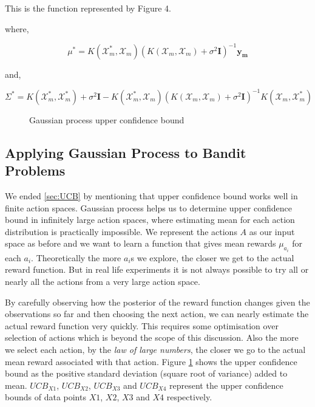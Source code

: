 \documentclass[english]{tktltiki}
\begin{document}
This is the function represented by Figure 4.

where,

\begin{equation}
\mu^* = K(\mathcal{X}_m^*, \mathcal{X}_m)(K(\mathcal{X}_m, \mathcal{X}_m) + \sigma^2 \mathbf{I})^{-1}\mathbf{y_m}
\label{gauss_poster_mean}
\end{equation}

and,

\begin{equation}
\Sigma^* = K(\mathcal{X}_m^*, \mathcal{X}_m^*) + \sigma^2 \mathbf{I} - K(\mathcal{X}_m^*, \mathcal{X}_m)(K(\mathcal{X}_m, \mathcal{X}_m) + \sigma^2 \mathbf{I})^{-1} K(\mathcal{X}_m, \mathcal{X}_m^*)
\label{gauss_poster_var}
\end{equation}

\begin{figure}[htb] 
\centering
 
\caption{Gaussian process upper confidence bound}
\label{fig:gp_ucb}
\end{figure}

\subsection{Applying Gaussian Process to Bandit Problems}

We ended \ref{sec:UCB} by mentioning that upper confidence bound works well in finite action spaces. Gaussian process helps us to determine upper confidence bound in infinitely large action spaces, where estimating mean for each action distribution is practically impossible. We represent the actions $A$ as our input space as before and we want to learn a function that gives mean rewards $\mu_{a_i}$ for each $a_i$. Theoretically the more $a_i$s we explore, the closer we get to the actual reward function. But in real life experiments it is not always possible to try all or nearly all the actions from a very large action space.





By carefully observing how the posterior of the reward function changes given the observations so far and then choosing the next action, we can nearly estimate the actual reward function very quickly. This requires some optimisation over selection of actions which is beyond the scope of this discussion. Also the more we select each action, by the \textit{law of large numbers}, the closer we go to the actual mean reward associated with that action. Figure \ref{fig:gp_ucb} shows the upper confidence bound as the positive standard deviation (square root of variance) added to mean. $UCB_{X1}$, $UCB_{X2}$, $UCB_{X3}$ and $UCB_{X4}$ represent the upper confidence bounds of data points $X1$, $X2$, $X3$ and $X4$ respectively.
\end{document}
